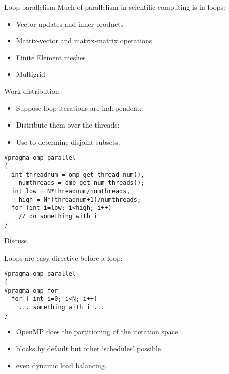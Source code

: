 
\begin{numberedframe}{Loop parallelism}
  Much of parallelism in scientific computing is in loops:
  \begin{itemize}
  \item Vector updates and inner products
  \item Matrix-vector and matrix-matrix operations
  \item Finite Element meshes
  \item Multigrid
  \end{itemize}
\end{numberedframe}

\begin{numberedframe}{Work distribution}
  \begin{itemize}
  \item Suppose loop iterations are independent:
  \item Distribute them over the threads:
  \item Use  to determine disjoint subsets.
  \end{itemize}
\begin{lstlisting}
#pragma omp parallel
{
  int threadnum = omp_get_thread_num(),
    numthreads = omp_get_num_threads();
  int low = N*threadnum/numthreads,
    high = N*(threadnum+1)/numthreads;
  for (int i=low; i<high; i++)
    // do something with i
}
\end{lstlisting}
Discuss.
\end{numberedframe}

\begin{numberedframe}{Loops are easy}
 directive before a loop:
\begin{lstlisting}
#pragma omp parallel
{
#pragma omp for
  for ( int i=0; i<N; i++)
    ... something with i ...
}
\end{lstlisting}
\begin{itemize}
\item OpenMP does the partitioning of the iteration space
\item blocks by default but other `schedules' possible
\item even dynamic load balancing.
\end{itemize}
\end{numberedframe}

